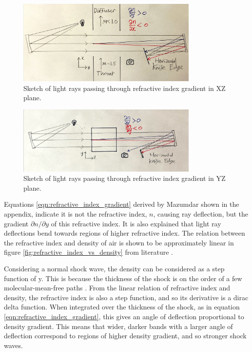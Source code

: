 \documentclass{article}
\begin{document}
\begin{figure}[H]
    \centering
    \includegraphics[width=0.8\textwidth]{xz_shlierian.jpg}
    \caption{Sketch of light rays passing through refractive index gradient in XZ plane.}
    \label{fig:xz_shlierian}
\end{figure}

\begin{figure}[H]
    \centering
    \includegraphics[width=0.8\textwidth]{yz_shlierian.jpg}
    \caption{Sketch of light rays passing through refractive index gradient in YZ plane.}
    \label{fig:yz_shlierian}
\end{figure}

Equations \ref{eqn:refractive_index_gradient} derived by Mazumdar \cite{Mazumdar_Amrita:2013} shown in the appendix, indicate it is not the refractive index, $n$, causing ray deflection, but the gradient $\partial n / \partial y$ of this refractive index.
It is also explained that light ray deflections bend towards regions of higher refractive index.
The relation between the refractive index and density of air is shown to be approximately linear in figure \ref{fig:refractive_index_vs_density} from literature \cite{refractiveindex_info} \cite{Ciddor:96}.

Considering a normal shock wave, the density can be considered as a step function of y.
This is because the thickness of the shock is on the order of a few molecular-mean-free paths \cite{babinsky_delery:2011}.
From the linear relation of refractive index and density, the refractive index is also a step function, and so its derivative is a dirac delta function.
When integrated over the thickness of the shock, as in equation \ref{eqn:refractive_index_gradient}, this gives an angle of deflection proportional to density gradient.
This means that wider, darker bands with a larger angle of deflection correspond to regions of higher density gradient, and so stronger shock waves.
\end{document}
